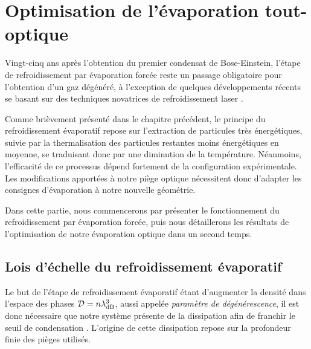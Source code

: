 \section{Optimisation de l'évaporation tout-optique}
\label{sc:evap_optique}
Vingt-cinq ans après l'obtention du premier condensat de Bose-Einstein, l'étape de refroidissement par évaporation forcée reste un passage obligatoire pour l'obtention d'un gaz dégénéré, à l'exception de quelques développements récents se basant sur des techniques novatrices de refroidissement laser \citep{stellmer2013laser} \citep{hu2017creation}. 

Comme brièvement présenté dans le chapitre précédent, le principe du refroidissement évaporatif repose sur l'extraction de particules très énergétiques, suivie par la thermalisation des particules restantes moins énergétiques en moyenne, se traduisant donc par une diminution de la température. Néanmoins, l'efficacité de ce processus dépend fortement de la configuration expérimentale. Les modifications apportées à notre piège optique nécessitent donc d'adapter les consignes d'évaporation à notre nouvelle géométrie. %

Dans cette partie, nous commencerons par présenter le fonctionnement du refroidissement par évaporation forcée, puis nous détaillerons les résultats de l'optimisation de notre évaporation optique dans un second temps.


\subsection{Lois d'échelle du refroidissement évaporatif}
\label{sc:scaling_laws_ohara}
Le but de l'étape de refroidissement évaporatif étant d'augmenter la densité dans l'espace des phases $\mathcal{D}=n \lambda_{\mathrm{dB}}^3$, aussi appelée \emph{paramètre de dégénérescence}, il est donc nécessaire que notre système présente de la dissipation afin de franchir le seuil de condensation \citep{metcalf2007laser}. L'origine de cette dissipation repose sur la profondeur finie des pièges utilisés.  


